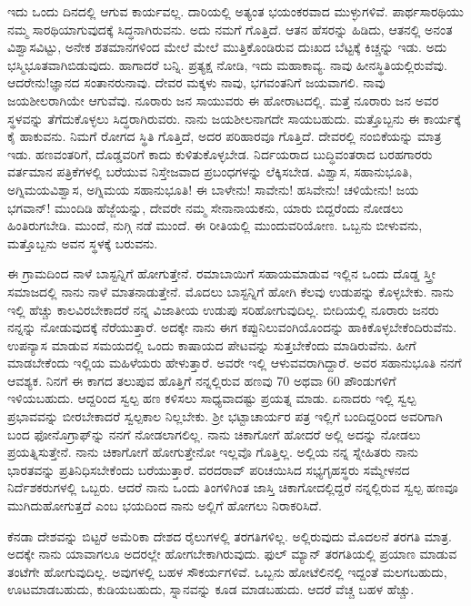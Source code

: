 ಇದು ಒಂದು ದಿನದಲ್ಲಿ ಆಗುವ ಕಾರ್ಯವಲ್ಲ. ದಾರಿಯಲ್ಲಿ ಅತ್ಯಂತ ಭಯಂಕರವಾದ ಮುಳ್ಳುಗಳಿವೆ. ಪಾರ್ಥಸಾರಥಿಯು ನಮ್ಮ ಸಾರಥಿಯಾಗುವುದಕ್ಕೆ ಸಿದ್ಧನಾಗಿರುವನು. ಅದು ನಮಗೆ ಗೊತ್ತಿದೆ. ಆತನ ಹೆಸರನ್ನು ಹಿಡಿದು, ಆತನಲ್ಲಿ ಅನಂತ ವಿಶ್ವಾಸವಿಟ್ಟು, ಅನೇಕ ಶತಮಾನಗಳಿಂದ ಮೇಲೆ ಮೇಲೆ ಮುತ್ತಿಕೊಂಡಿರುವ ದುಃಖದ ಬೆಟ್ಟಕ್ಕೆ ಕಿಚ್ಚನ್ನು ಇಡು. ಅದು ಭಸ್ಮಿಭೂತವಾಗಿಬಿಡುವುದು. ಹಾಗಾದರೆ ಬನ್ನಿ. ಪ್ರತ್ಯಕ್ಷ ನೋಡಿ, ಇದು ಮಹಾಕಾವ್ಯ. ನಾವು ಹೀನಸ್ಥಿತಿಯಲ್ಲಿರುವೆವು. ಆದರೇನು!ಜ್ಞಾನದ ಸಂತಾನರುನಾವು. ದೇವರ ಮಕ್ಕಳು ನಾವು, ಭಗವಂತನಿಗೆ ಜಯವಾಗಲಿ. ನಾವು ಜಯಶೀಲರಾಗಿಯೇ ಆಗುವೆವು. ನೂರಾರು ಜನ ಸಾಯುವರು ಈ ಹೋರಾಟದಲ್ಲಿ. ಮತ್ತೆ ನೂರಾರು ಜನ ಅವರ ಸ್ಥಳವನ್ನು ತೆಗೆದುಕೊಳ್ಳಲು ಸಿದ್ಧರಾಗಿರುವರು. ನಾನು ಜಯಶೀಲನಾಗದೇ ಸಾಯಬಹುದು. ಮತ್ತೊಬ್ಬನು ಈ ಕಾರ್ಯಕ್ಕೆ ಕೈ ಹಾಕುವನು. ನಿಮಗೆ ರೋಗದ ಸ್ಥಿತಿ ಗೊತ್ತಿದೆ, ಅದರ ಪರಿಹಾರವೂ ಗೊತ್ತಿದೆ. ದೇವರಲ್ಲಿ ನಂಬಿಕೆಯನ್ನು ಮಾತ್ರ ಇಡು. ಹಣವಂತರಿಗೆ, ದೊಡ್ಡವರಿಗೆ ಕಾದು ಕುಳಿತುಕೊಳ್ಳಬೇಡ. ನಿರ್ದಯರಾದ ಬುದ್ಧಿವಂತರಾದ ಬರಹಗಾರರು ವರ್ತಮಾನ ಪತ್ರಿಕೆಗಳಲ್ಲಿ ಬರೆಯುವ ನಿಸ್ತೇಜವಾದ ಪ್ರಬಂಧಗಳನ್ನು ಲೆಕ್ಕಿಸಬೇಡ. ವಿಶ್ವಾಸ, ಸಹಾನುಭೂತಿ, ಅಗ್ನಿಮಯವಿಶ್ವಾಸ, ಅಗ್ನಿಮಯ ಸಹಾನುಭೂತಿ! ಈ ಬಾಳೇನು! ಸಾವೇನು! ಹಸಿವೇನು! ಚಳಿಯೇನು! ಜಯ ಭಗವಾನ್! ಮುಂದಿಡಿ ಹೆಜ್ಜೆಯನ್ನು, ದೇವರೇ ನಮ್ಮ ಸೇನಾನಾಯಕನು, ಯಾರು ಬಿದ್ದರೆಂದು ನೋಡಲು \enginline{-} ಹಿಂತಿರುಗಬೇಡಿ. ಮುಂದೆ, ನುಗ್ಗಿ ನಡೆ ಮುಂದೆ. ಈ ರೀತಿಯಲ್ಲಿ ಮುಂದುವರಿಯೋಣ. ಒಬ್ಬನು ಬೀಳುವನು, ಮತ್ತೊಬ್ಬನು ಅವನ ಸ್ಥಳಕ್ಕೆ ಬರುವನು.

ಈ ಗ್ರಾಮದಿಂದ ನಾಳೆ ಬಾಸ್ಟನ್ನಿಗೆ ಹೋಗುತ್ತೇನೆ. ರಮಾಬಾಯಿಗೆ ಸಹಾಯಮಾಡುವ ಇಲ್ಲಿನ ಒಂದು ದೊಡ್ಡ ಸ್ತ್ರೀ ಸಮಾಜದಲ್ಲಿ ನಾನು ನಾಳೆ ಮಾತನಾಡುತ್ತೇನೆ. ಮೊದಲು ಬಾಸ್ಟನ್ನಿಗೆ ಹೋಗಿ ಕೆಲವು ಉಡುಪನ್ನು ಕೊಳ್ಳಬೇಕು. ನಾನು ಇಲ್ಲಿ ಹೆಚ್ಚು ಕಾಲವಿರಬೇಕಾದರೆ ನನ್ನ ವಿಜಾತೀಯ ಉಡುಪು ಸರಿಹೋಗುವುದಿಲ್ಲ. ಬೀದಿಯಲ್ಲಿ ನೂರಾರು ಜನರು ನನ್ನನ್ನು ನೋಡುವುದಕ್ಕೆ ನೆರೆಯುತ್ತಾರೆ. ಅದಕ್ಕೇ ನಾನು ಈಗ ಕಪ್ಪುನಿಲುವಂಗಿಯೊಂದನ್ನು ಹಾಕಿಕೊಳ್ಳಬೇಕೆಂದಿರುವೆನು. ಉಪನ್ಯಾಸ ಮಾಡುವ ಸಮಯದಲ್ಲಿ ಒಂದು ಕಾಷಾಯದ ಪೇಟವನ್ನು ಸುತ್ತಬೇಕೆಂದು ಮಾಡಿರುವೆನು. ಹೀಗೆ ಮಾಡಬೇಕೆಂದು ಇಲ್ಲಿಯ ಮಹಿಳೆಯರು ಹೇಳುತ್ತಾರೆ. ಅವರೇ ಇಲ್ಲಿ ಆಳುವವರಾಗಿದ್ದಾರೆ. ಅವರ ಸಹಾನುಭೂತಿ ನನಗೆ ಆವಶ್ಯಕ. ನಿನಗೆ ಈ ಕಾಗದ ತಲುಪುವ ಹೊತ್ತಿಗೆ ನನ್ನಲ್ಲಿರುವ ಹಣವು 70 ಅಥವಾ 60 ಪೌಂಡುಗಳಿಗೆ ಇಳಿಯಬಹುದು. ಆದ್ದರಿಂದ ಸ್ವಲ್ಪ ಹಣ ಕಳಿಸಲು ಸಾಧ್ಯವಾದಷ್ಟು ಪ್ರಯತ್ನ ಮಾಡು. ಏನಾದರು ಇಲ್ಲಿ ಸ್ವಲ್ಪ ಪ್ರಭಾವವನ್ನು ಬೀರಬೇಕಾದರೆ ಸ್ವಲ್ಪಕಾಲ ನಿಲ್ಲಬೇಕು. ಶ‍್ರೀ ಭಟ್ಟಾಚಾರ್ಯರ ಪತ್ರ ಇಲ್ಲಿಗೆ ಬಂದಿದ್ದರಿಂದ ಅವರಿಗಾಗಿ ಬಂದ ಫೋನೊಗ್ರಾಫ್‌ನ್ನು ನನಗೆ ನೋಡಲಾಗಲಿಲ್ಲ. ನಾನು ಚಿಕಾಗೋಗೆ ಹೋದರೆ ಅಲ್ಲಿ ಅದನ್ನು ನೋಡಲು ಪ್ರಯತ್ನಿಸುತ್ತೇನೆ. ನಾನು ಚಿಕಾಗೋಗೆ ಹೋಗುತ್ತೇನೋ ಇಲ್ಲವೊ ಗೊತ್ತಿಲ್ಲ. ಅಲ್ಲಿಯ ನನ್ನ ಸ್ನೇಹಿತರು ನಾನು ಭಾರತವನ್ನು ಪ್ರತಿನಿಧಿಸಬೇಕೆಂದು ಬರೆಯುತ್ತಾರೆ. ವರದರಾವ್ ಪರಿಚಯಿಸಿದ ಸಭ್ಯಗೃಹಸ್ಥರು ಸಮ್ಮೇಳನದ ನಿರ್ದೆಶಕರುಗಳಲ್ಲಿ ಒಬ್ಬರು. ಆದರೆ ನಾನು ಒಂದು ತಿಂಗಳಿಗಿಂತ ಜಾಸ್ತಿ ಚಿಕಾಗೋದಲ್ಲಿದ್ದರೆ ನನ್ನಲ್ಲಿರುವ ಸ್ವಲ್ಪ ಹಣವೂ ಮುಗಿದುಹೋಗುತ್ತದೆ ಎಂಬ ಭಯದಿಂದ ನಾನು ಅಲ್ಲಿಗೆ ಹೋಗಲು ನಿರಾಕರಿಸಿದೆ.

ಕೆನಡಾ ದೇಶವನ್ನು ಬಿಟ್ಟರೆ ಅಮೆರಿಕಾ ದೇಶದ ರೈಲುಗಳಲ್ಲಿ ತರಗತಿಗಳಿಲ್ಲ. ಅಲ್ಲಿರುವುದು ಮೊದಲನೆ ತರಗತಿ ಮಾತ್ರ. ಅದಕ್ಕೇ ನಾನು ಯಾವಾಗಲೂ ಅದರಲ್ಲೇ ಹೋಗಬೇಕಾಗಿರುವುದು. ಫುಲ್ ಮ್ಯಾನ್ ತರಗತಿಯಲ್ಲಿ ಪ್ರಯಾಣ ಮಾಡುವ ತಂಟೆಗೇ ಹೋಗುವುದಿಲ್ಲ. ಅವುಗಳಲ್ಲಿ ಬಹಳ ಸೌಕರ್ಯಗಳಿವೆ. ಒಬ್ಬನು ಹೋಟೆಲಿನಲ್ಲಿ ಇದ್ದಂತೆ ಮಲಗಬಹುದು, ಊಟಮಾಡಬಹುದು, ಕುಡಿಯಬಹುದು, ಸ್ನಾನವನ್ನು ಕೂಡ ಮಾಡಬಹುದು. ಆದರೆ ವೆಚ್ಚ ಬಹಳ ಹೆಚ್ಚು.

